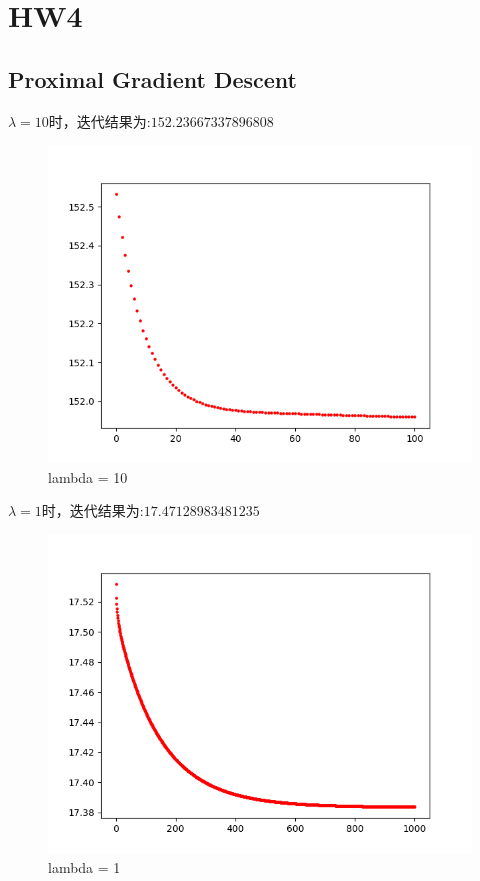 \documentclass{xjtureport}
\begin{document}
\section{HW4}

\subsection{Proximal Gradient Descent}
$\lambda = 10$时，迭代结果为:$152.23667337896808$
\begin{figure}[H]
    \centering
    \includegraphics[scale = 0.6]{figures/Prox_lam=10.png}
    \caption{lambda = 10}
    \end{figure}
$\lambda = 1$时，迭代结果为:$17.47128983481235$
\begin{figure}[H]
    \centering
    \includegraphics[scale = 0.6]{figures/Prox_lam=1.png}
    \caption{lambda = 1}
    \end{figure}
\end{document}
